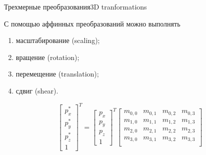 \documentclass{beamer}
\begin{document}
	\begin{frame}{Трехмерные преобразования}{3D tranformations}

		С помощью аффинных преобразований можно выполнять
		\begin{enumerate}
			\item масштабирование (scaling);
			\item вращение (rotation);
			\item перемещение (translation);
			\item сдвиг (shear).
		\end{enumerate}
		
		\[
			\begin{bmatrix}
				p_x^{*} \\
				p_y^{*} \\
				p_z^{*} \\
				1
			\end{bmatrix}^T
			=
			\begin{bmatrix}
				p_x \\
				p_y \\
				p_z \\
				1
			\end{bmatrix}^T
			\begin{bmatrix}
				m_{0,0} & m_{0,1} & m_{0,2} & m_{0,3}  \\
				m_{1,0} & m_{1,1} & m_{1,2} & m_{1,3}  \\
				m_{2,0} & m_{2,1} & m_{2,2} & m_{2,3}  \\
				m_{3,0} & m_{3,1} & m_{3,2} & m_{3,3}  \\
			\end{bmatrix}
		\]
\end{frame}
\end{document}
